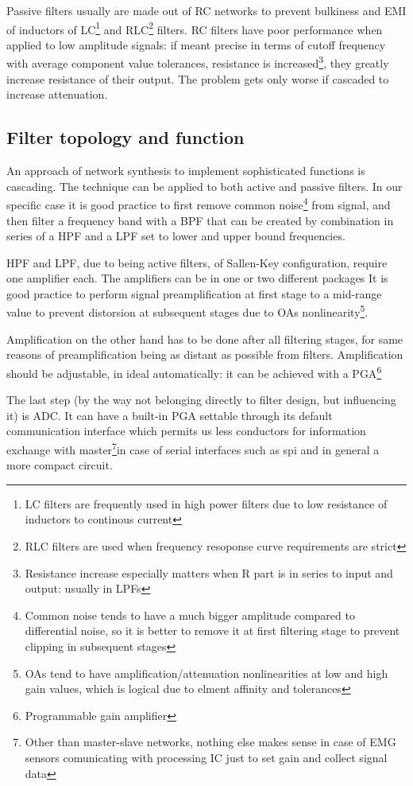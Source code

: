 \documentclass[a4paper, 10pt]{article} %
\newcommand{\parenciteit}[2]{\textit{\parencite[#1]{#2}}} %
\begin{document}
    \noindent Passive filters usually are made out of RC networks to prevent bulkiness and EMI of inductors of LC\footnote{LC filters are frequently used in high power filters due to low resistance of inductors to continous current} and RLC\footnote{RLC filters are used when frequency resoponse curve requirements are strict} filters. RC filters have poor performance when applied to low amplitude signals: if meant precise in terms of cutoff frequency with average component value tolerances, resistance is increased\footnote{Resistance increase especially matters when R part is in series to input and output: usually in LPFs}, they greatly increase resistance of their output. The problem gets only worse if cascaded to increase attenuation.

    \subsection*{Filter topology and function}
    \hspace{\parindent} An approach of network synthesis to implement sophisticated functions is cascading. The technique can be applied to both active and passive filters. In our specific case it is good practice to first remove common noise\footnote{Common noise tends to have a much bigger amplitude compared to differential noise, so it is better to remove it at first filtering stage to prevent clipping in subsequent stages} from signal, and then filter a frequency band with a BPF that can be created by combination in series of a HPF and a LPF set to lower and upper bound frequencies.
    
    HPF and LPF, due to being active filters, of Sallen-Key configuration, require one amplifier each. The amplifiers can be in one or two different packages
    It is good practice to perform signal preamplification at first stage to a mid-range value\parenciteit{pp436-437}{Naik} to prevent distorsion at subsequent stages due to OAs nonlinearity\footnote{OAs tend to have amplification/attenuation nonlinearities at low and high gain values, which is logical due to elment affinity and tolerances}.

    Amplification on the other hand has to be done after all filtering stages, for same reasons of preamplification being as distant as possible from filters. Amplification should be adjustable, in ideal automatically: it can be achieved with a PGA\footnote{Programmable gain amplifier}

    The last step (by the way not belonging directly to filter design, but influencing it) is ADC. It can have a built-in PGA settable through its default communication interface which permits us less conductors for information exchange with master\footnote{Other than master-slave networks, nothing else makes sense in case of EMG sensors comunicating with processing IC just to set gain and collect signal data}in case of serial interfaces such as spi and in general a more compact circuit.
\end{document}
